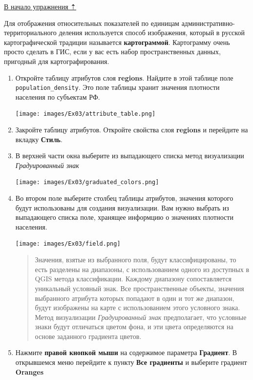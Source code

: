 \documentclass[
  12pt,
]{book}
\begin{document}
\protect\hyperlink{map-design-population}{В начало упражнения ⇡}

Для отображения относительных показателей по единицам административно-территориального деления используется способ изображения, который в русской картографической традиции называется \textbf{картограммой}. Картограмму очень просто сделать в ГИС, если у вас есть набор пространственных данных, пригодный для картографирования.

\begin{enumerate}
\def\labelenumi{\arabic{enumi}.}
\item
  Откройте таблицу атрибутов слоя \textbf{regions}. Найдите в этой таблице поле \texttt{population\_density}. Это поле таблицы хранит значения плотности населения по субъектам РФ.

  \texttt{[image: images/Ex03/attribute\_table.png]}
\item
  Закройте таблицу атрибутов. Откройте свойства слоя \textbf{regions} и перейдите на вкладку \textbf{Стиль}.
\item
  В верхней части окна выберите из выпадающего списка метод визуализации \emph{Градуированный знак}

  \texttt{[image: images/Ex03/graduated\_colors.png]}
\item
  Во втором поле выберите столбец таблицы атрибутов, значения которого будут использованы для создания визуализации. Вам нужно выбрать из выпадающего списка поле, хранящее информцию о значениях плотности населения.

  \texttt{[image: images/Ex03/field.png]}

  \begin{quote}
  Значения, взятые из выбранного поля, будут классифицированы, то есть разделены на диапазоны, с использованием одного из доступных в QGIS метода классификации. Каждому диапазону сопоставляется уникальный условный знак. Все пространственные объекты, значения выбранного атрибута которых попадают в один и тот же диапазон, будут изображены на карте с использованием этого условного знака. Метод визуализации \emph{Градуированный знак} предполагает, что условные знаки будут отличаться цветом фона, и эти цвета определяются на основе заданного градиента цветов.
  \end{quote}
\item
  Нажмите \textbf{правой кнопкой мыши} на содержимое параметра \textbf{Градиент}. В открывшемся меню перейдите к пункту \textbf{Все градиенты} и выберите градиент \textbf{Oranges}


\end{enumerate}
\end{document}
